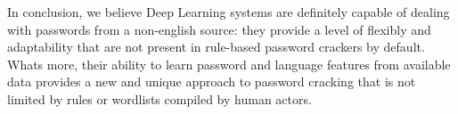 In conclusion, we believe Deep Learning systems are definitely capable of dealing with passwords from a non-english source: they provide a level of flexibly and adaptability that are not present in rule-based password crackers by default. Whats more, their ability to learn password and language features from available data provides a new and unique approach to password cracking that is not limited by rules or wordlists compiled by human actors.
